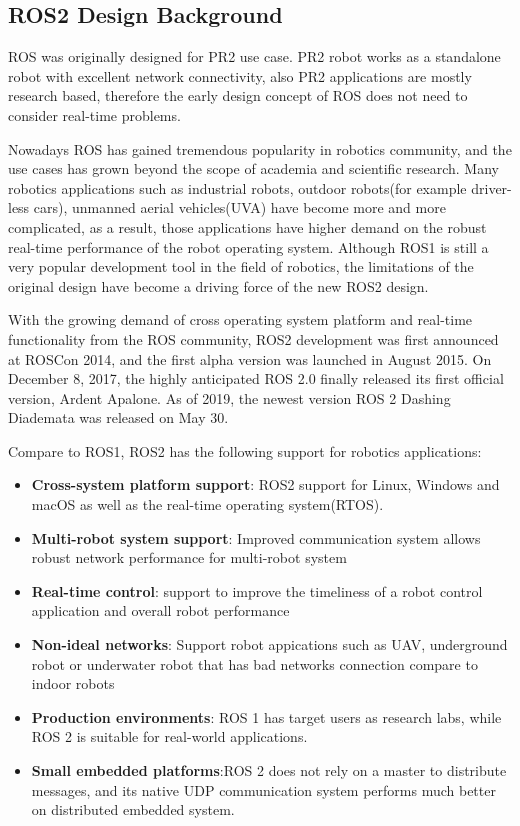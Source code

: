 \documentclass[letterpaper, 10 pt, conference]{ieeeconf}  %
\begin{document}
\subsection{ROS2 Design Background}
ROS was originally designed for PR2 use case. PR2 robot works as a standalone robot with excellent network connectivity, also PR2 applications are mostly research based, therefore the early design concept of ROS does not need to consider real-time problems.
\par\vspace{3pt} 
Nowadays ROS has gained tremendous popularity in robotics community, and the use cases has grown beyond the scope of academia and scientific research. Many robotics applications such as  industrial robots, outdoor robots(for example driver-less cars), unmanned aerial vehicles(UVA) have become more and more complicated, as a result, those applications have higher demand on the robust real-time performance of the robot operating system. Although ROS1 is still a very popular development tool in the field of robotics, the limitations of the original design have become a driving force of the new ROS2 design\cite{c3}. 
\par\vspace{3pt} 
With the growing demand of cross operating system platform and real-time functionality from the ROS community, ROS2 development was first announced at ROSCon 2014, and the first alpha version was launched in August 2015. On December 8, 2017, the highly anticipated ROS 2.0 finally released its first official version, Ardent Apalone. As of 2019, the newest version ROS 2 Dashing Diademata was released on May 30.
\par\vspace{3pt} 
Compare to ROS1, ROS2 has the following support for robotics applications\cite{c3}: 
\begin{itemize}
  \item \textbf{Cross-system platform support}: ROS2 support for Linux, Windows and macOS as well as the real-time operating system(RTOS).
  \item \textbf{Multi-robot system support}: Improved communication system allows robust network performance for multi-robot system 
  \item \textbf{Real-time control}: support to improve the timeliness of a robot control application and overall robot performance
  \item \textbf{Non-ideal networks}: Support robot appications such as UAV, underground robot or underwater robot that has bad networks connection compare to indoor robots 
  \item \textbf{Production environments}: ROS 1 has target users as research labs, while ROS 2 is suitable for real-world applications. 
  \item \textbf{Small embedded platforms}:ROS 2 does not rely on a master to distribute messages, and its native UDP communication system performs much better on distributed embedded system\cite{c6}. 
\end{itemize}
\end{document}
